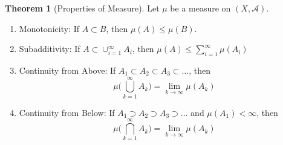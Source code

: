 \documentclass{article}
\theoremstyle{definition}
\newtheorem{theorem}{Theorem}[section]
\theoremstyle{remark}
\theoremstyle{definition}
\begin{document}
\begin{theorem}[Properties of Measure]
Let $\mu$ be a measure on $(X, \mathcal{A})$. 
\begin{enumerate}
    \item Monotonicity: If $A \subset B$, then $\mu(A) \leq \mu(B)$. 
    \item Subadditivity: If $A \subset \cup_{i=1}^\infty A_i$, then $\mu(A) \leq \sum_{i=1}^\infty \mu (A_i)$ 
    \item Continuity from Above: If $A_1 \subset A_2 \subset A_3 \subset \ldots$, then 
    \[\mu\bigg( \bigcup_{k=1}^\infty A_k \bigg) = \lim_{k \rightarrow \infty} \mu(A_k)\]
    \item Continuity from Below: If $A_1 \supset A_2 \supset A_3 \supset \ldots$ and $\mu(A_1) < \infty$, then 
    \[\mu\bigg( \bigcap_{k=1}^\infty A_k \bigg) = \lim_{k \rightarrow \infty} \mu(A_k)\] 
\end{enumerate}
\end{theorem}
\end{document}
